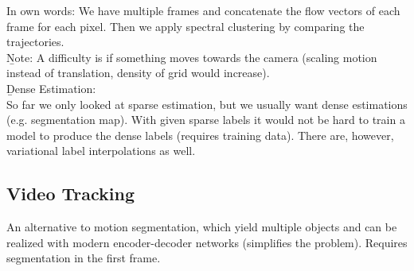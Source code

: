 In own words: We have multiple frames and concatenate the flow vectors of each frame for each pixel. Then we apply spectral clustering by comparing the trajectories.\\

\b{Note:} A difficulty is if something moves towards the camera (scaling motion instead of translation, density of grid would increase).\\

\b{Dense Estimation:\\[0.5em]}
So far we only looked at sparse estimation, but we usually want dense estimations (e.g. segmentation map). With given sparse labels it would not be hard to train a model to produce the dense labels (requires training data). There are, however, variational label interpolations as well.

\subsection{Video Tracking}
An alternative to motion segmentation, which yield multiple objects and can be realized with modern encoder-decoder networks (simplifies the problem). Requires segmentation in the first frame.
\newpage